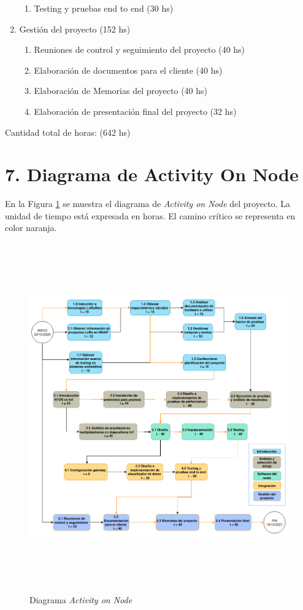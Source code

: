 \documentclass[11pt]{charter}
\begin{document}
\begin{enumerate}
\begin{enumerate}
	\item Testing y pruebas end to end (30 hs)
	\end{enumerate}
\item Gestión del proyecto (152 hs)
	\begin{enumerate}
	\item Reuniones de control y seguimiento del proyecto (40 hs)
	\item Elaboración de documentos para el cliente (40 hs)
	\item Elaboración de Memorias del proyecto (40 hs)
	\item Elaboración de presentación final del proyecto (32 hs)
	\end{enumerate}
\end{enumerate}

Cantidad total de horas: (642 hs)


\section{7. Diagrama de Activity On Node}
\label{sec:AoN}

En la Figura \ref{fig:AoN} se muestra el diagrama de \textit{Activity on Node} del proyecto. La unidad de tiempo está expresada en horas.
El camino crítico se representa en color naranja.
\begin{figure}[htpb]
\centering 
\includegraphics[width=16cm, height=15cm]{./Figuras/aon.png}
\caption{Diagrama \textit{Activity on Node}}
\label{fig:AoN}
\end{figure}
\end{document}
